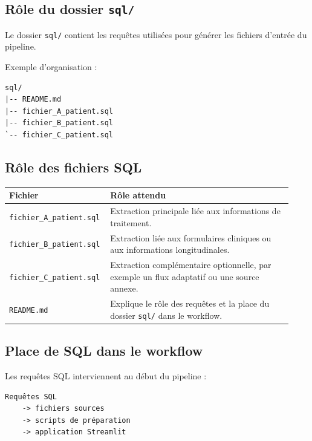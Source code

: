 \documentclass[11pt,a4paper]{article}
\newcommand{\code}[1]{\texttt{#1}}
\begin{document}
\subsection{Rôle du dossier \code{sql/}}

Le dossier \code{sql/} contient les requêtes utilisées pour générer les fichiers d'entrée du pipeline.

Exemple d'organisation :

\begin{lstlisting}
sql/
|-- README.md
|-- fichier_A_patient.sql
|-- fichier_B_patient.sql
`-- fichier_C_patient.sql
\end{lstlisting}

\subsection{Rôle des fichiers SQL}

\begin{longtable}{p{0.30\linewidth} p{0.63\linewidth}}
\toprule
\textbf{Fichier} & \textbf{Rôle attendu} \\
\midrule
\endhead

\code{fichier\_A\_patient.sql} &
Extraction principale liée aux informations de traitement. \\

\code{fichier\_B\_patient.sql} &
Extraction liée aux formulaires cliniques ou aux informations longitudinales. \\

\code{fichier\_C\_patient.sql} &
Extraction complémentaire optionnelle, par exemple un flux adaptatif ou une source annexe. \\

\code{README.md} &
Explique le rôle des requêtes et la place du dossier \code{sql/} dans le workflow. \\

\bottomrule
\end{longtable}

\subsection{Place de SQL dans le workflow}

Les requêtes SQL interviennent au début du pipeline :

\begin{lstlisting}
Requêtes SQL
    -> fichiers sources
    -> scripts de préparation
    -> application Streamlit
\end{lstlisting}
\end{document}

